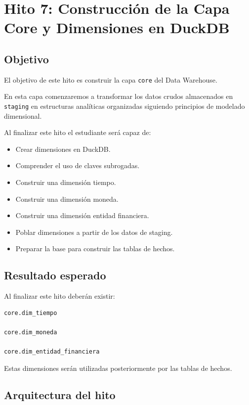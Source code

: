 \chapter{Hito 7: Construcción de la Capa Core y Dimensiones en DuckDB}

\section{Objetivo}

El objetivo de este hito es construir la capa \texttt{core} del Data Warehouse.

En esta capa comenzaremos a transformar los datos crudos almacenados en \texttt{staging} en estructuras analíticas organizadas siguiendo principios de modelado dimensional.

Al finalizar este hito el estudiante será capaz de:

\begin{itemize}
\item Crear dimensiones en DuckDB.
\item Comprender el uso de claves subrogadas.
\item Construir una dimensión tiempo.
\item Construir una dimensión moneda.
\item Construir una dimensión entidad financiera.
\item Poblar dimensiones a partir de los datos de staging.
\item Preparar la base para construir las tablas de hechos.
\end{itemize}

\section{Resultado esperado}

Al finalizar este hito deberán existir:

\begin{verbatim}
core.dim_tiempo

core.dim_moneda

core.dim_entidad_financiera
\end{verbatim}

Estas dimensiones serán utilizadas posteriormente por las tablas de hechos.

\section{Arquitectura del hito}

